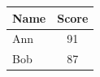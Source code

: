 \documentclass{article}
\begin{document}
\begin{tabular}{|l|c|}
\hline
\rowcolor{gray!25} Name & Score \\
\hline
Ann & 91 \\
\rowcolor{yellow!30} Bob & 87 \\
\hline
\end{tabular}
\end{document}
